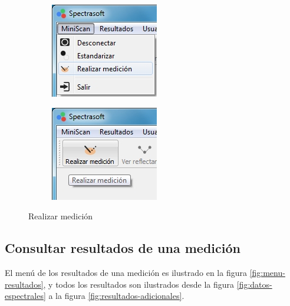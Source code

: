 \begin{figure}[H]
\centering
\begin{subfigure}{.5\textwidth}
  \centering
  \includegraphics[width=.6\linewidth]{./img/medir-menu.jpg}
\end{subfigure}%
\begin{subfigure}{.5\textwidth}
  \centering
  \includegraphics[width=.6\linewidth]{./img/medir-barra.jpg}
\end{subfigure}
\caption[]{Realizar medici\'{o}n\label{fig:medicion}}
\end{figure}

	\subsection*{Consultar resultados de una medici\'{o}n}
	
	El men\'{u} de los resultados de una medici\'{o}n es ilustrado en la figura \ref{fig:menu-resultados}, y todos los resultados son ilustrados desde la figura \ref{fig:datos-espectrales} a la figura \ref{fig:resultados-adicionales}.

